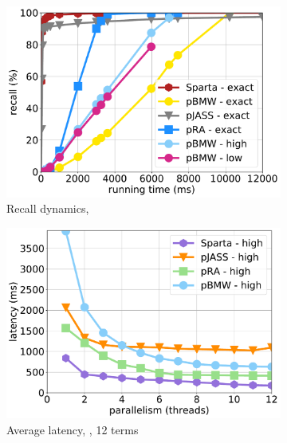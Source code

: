 {{\begin{figure}[tbh]
	
      \begin{subfigure}{0.325\textwidth}
      	\includegraphics[width=\textwidth]{figures/cumulative_12threads_cluewebX10.pdf}
        \caption{Recall dynamics, \cwten}
	\label{fig:dynamics-cluewebX10}
      \end{subfigure}  
\hfill
      \begin{subfigure}{0.325\textwidth}
         \includegraphics[width=\textwidth]{figures/latency_12terms_clueweb.pdf}
        \caption{Average latency, \cw, 12 terms}
        	\label{fig:threads-scaling-cw}
      \end{subfigure}
\hfill 
      \begin{subfigure}{0.325\textwidth}

\end{subfigure}
\end{figure}}}
